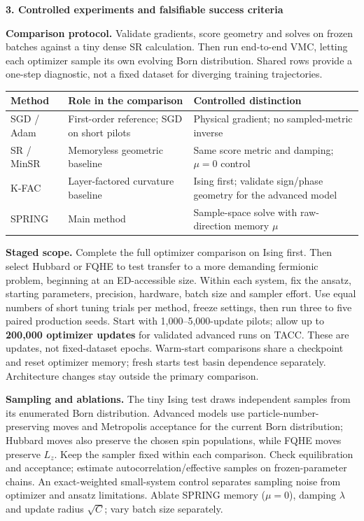 \documentclass[10pt,letterpaper]{article}
\newcommand{\topic}[1]{\vspace{4pt}\textbf{\color{ink}#1}\par}
\begin{document}
\newpage
\topic{3. Controlled experiments and falsifiable success criteria}
\textbf{Comparison protocol.} Validate gradients, score geometry and solves on frozen batches against a tiny dense SR calculation. Then run end-to-end VMC, letting each optimizer sample its own evolving Born distribution. Shared rows provide a one-step diagnostic, not a fixed dataset for diverging training trajectories.

\begin{center}\small
\begin{tabular}{@{}p{1.05in}p{2.63in}p{2.95in}@{}}\toprule
Method & Role in the comparison & Controlled distinction\\\midrule
SGD / Adam & First-order reference; SGD on short pilots & Physical gradient; no sampled-metric inverse\\
SR / MinSR & Memoryless geometric baseline & Same score metric and damping; $\mu=0$ control\\
K-FAC & Layer-factored curvature baseline & Ising first; validate sign/phase geometry for the advanced model\\
SPRING & Main method & Sample-space solve with raw-direction memory $\mu$\\\bottomrule
\end{tabular}\end{center}

\textbf{Staged scope.} Complete the full optimizer comparison on Ising first. Then select Hubbard or FQHE to test transfer to a more demanding fermionic problem, beginning at an ED-accessible size. Within each system, fix the ansatz, starting parameters, precision, hardware, batch size and sampler effort. Use equal numbers of short tuning trials per method, freeze settings, then run three to five paired production seeds. Start with 1,000--5,000-update pilots; allow up to \textbf{200,000 optimizer updates} for validated advanced runs on TACC. These are updates, not fixed-dataset epochs. Warm-start comparisons share a checkpoint and reset optimizer memory; fresh starts test basin dependence separately. Architecture changes stay outside the primary comparison.

\textbf{Sampling and ablations.} The tiny Ising test draws independent samples from its enumerated Born distribution. Advanced models use particle-number-preserving moves and Metropolis acceptance for the current Born distribution; Hubbard moves also preserve the chosen spin populations, while FQHE moves preserve $L_z$. Keep the sampler fixed within each comparison. Check equilibration and acceptance; estimate autocorrelation/effective samples on frozen-parameter chains. An exact-weighted small-system control separates sampling noise from optimizer and ansatz limitations. Ablate SPRING memory ($\mu=0$), damping $\lambda$ and update radius $\sqrt C$; vary batch size separately.
\end{document}
